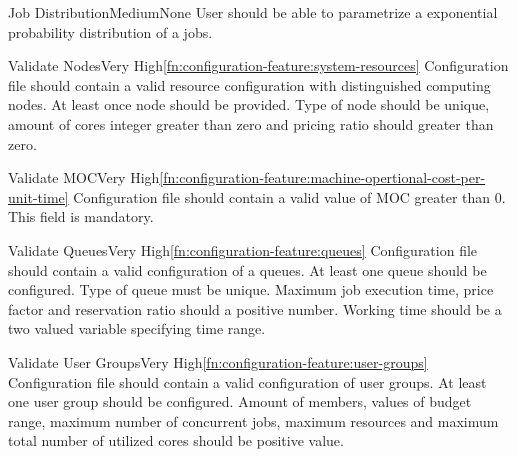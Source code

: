 	\begin{functional}{Job Distribution}{Medium}{None}
		\label{fn:configuration-feature:job-distribution}
		{
			User should be able to parametrize a exponential probability distribution of a jobs. 
		}
	\end{functional}

		
	\begin{functional}{Validate Nodes}{Very High}{\ref{fn:configuration-feature:system-resources}}
		\label{fn:configuration-feature:valid-nodes}
		{
			Configuration file should contain a valid resource configuration with distinguished \gls{computing node}s. At least once node should be provided. Type of node should be unique, amount of cores integer greater than zero and pricing ratio should greater than zero.  
		}
	\end{functional}

	\begin{functional}{Validate \gls{MOC}}{Very High}{\ref{fn:configuration-feature:machine-opertional-cost-per-unit-time}}
		\label{fn:configuration-feature:valid-moc}
		{
			Configuration file should contain a valid value of \gls{MOC} greater than $0$. This field is mandatory.
		}
	\end{functional}

	\begin{functional}{Validate Queues}{Very High}{\ref{fn:configuration-feature:queues}}
		\label{fn:configuration-feature:valid-queues}
		{
			Configuration file should contain a valid configuration of a queues. At least one queue should be configured.
			Type of queue must be unique. Maximum job execution time, price factor and reservation ratio should a positive number.
			Working time should be a two valued variable specifying time range.
		}
	\end{functional}

	\begin{functional}{Validate User Groups}{Very High}{\ref{fn:configuration-feature:user-groups}}
		\label{fn:configuration-feature:valid-user-groups}
		{
			Configuration file should contain a valid configuration of user groups. At least one user group should be configured. Amount of members, values of budget range, maximum number of concurrent jobs, maximum resources and maximum total number of utilized cores should be positive value.
		}
	\end{functional}

